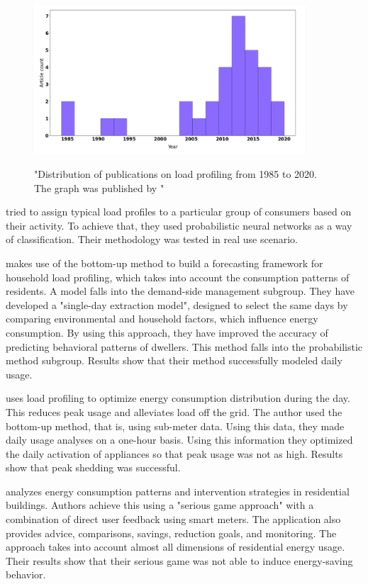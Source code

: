 \begin{figure}[H]
	\centering
	\caption{"Distribution of publications on load profiling from 1985 to 2020. The graph was published by \protect\cite{Review2021}"}
	\includegraphics[width=0.9\textwidth]{Figures/publications.png}
	\label{fig:Distribution}
\end{figure}

\cite{GERBEC2005} tried to assign typical load profiles to a particular group of consumers based on their activity. 
To achieve that, they used probabilistic neural networks as a way of classification. Their methodology was tested in real use scenario. 

\cite{Gao2018} makes use of the bottom-up method to build a forecasting framework for household
load profiling, which takes into account the consumption patterns of residents. 
A model falls into the demand-side management subgroup.
They have developed a "single-day extraction model", designed to select the same days by comparing environmental and household factors, which influence energy consumption.
By using this approach, they have improved the accuracy of predicting behavioral patterns of dwellers. 
This method falls into the probabilistic method subgroup. Results show that their method successfully modeled daily usage.

\cite{Chuan2014} uses load profiling to optimize energy consumption distribution during the day.
This reduces peak usage and alleviates load off the grid. The author used the bottom-up method, that is, using sub-meter data.
Using this data, they made daily usage analyses on a one-hour basis. Using this information they optimized the daily activation of appliances
so that peak usage was not as high. Results show that peak shedding was successful. 

\cite{Csoknyai2019} analyzes energy consumption patterns and intervention strategies in residential buildings.
Authors achieve this using a "serious game approach" with a combination of direct user feedback using smart meters. 
The application also provides advice, comparisons, savings, reduction goals, and monitoring.
The approach takes into account almost all dimensions of residential energy usage. Their results show that their serious game was not
able to induce energy-saving behavior.

